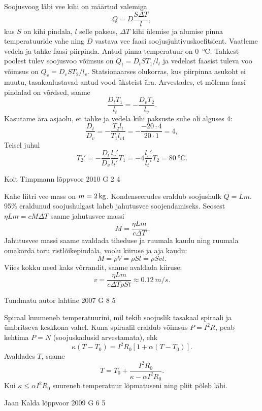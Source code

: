 \documentclass[11pt]{article}
\begin{document}
{{\ifSolution
Soojusvoog läbi vee kihi on määrtud valemiga
\[
Q = D\frac{S\Delta T}{l},
\]
kus $S$ on kihi pindala, $l$ selle paksus, $\Delta T$ kihi ülemise ja alumise pinna temperatuuride vahe ning $D$ vastava vee faasi soojusjuhtivuskoefitsient. Vaatleme vedela ja tahke faasi piirpinda. Antud pinna temperatuur on \SI{0}{\celsius}. Tahkest poolest tulev soojusvoo võimsus on
$Q_t = D_tST_1/l_t$
ja vedelast faasist tuleva voo võimsus on
$Q_v = D_vST_2/l_v$.
Statsionaarses olukorras, kus piirpinna asukoht ei muutu, tasakaalustavad antud vood üksteist ära. Arvestades, et mõlema faasi pindalad on võrdsed, saame
\[
\frac{D_tT_1}{l_t} = -\frac{D_vT_2}{l_v}.
\]
Kasutame ära asjaolu, et tahke ja vedela kihi paksuste suhe oli alguses \num{4}:
\[
\frac{D_t}{D_v} = -\frac{T_{2} l_{t}}{T_1 l_{v1}}=-\frac{\num{-20}\cdot \num{4}}{\num{20}\cdot \num{1}} = \num{4},
\]
Teisel juhul
\[
T_{2}' = -\frac{D_{t}}{D_{v}}\frac{l_{v}'}{l_{t}'} T_1 = \num{-4}\frac{l_v'}{l_t'} T_2 = \SI{80}{\celsius}.
\]
\fi
}

{Koit Timpmann} %
{lõppvoor} %
{2010} %
{G 2} %
{4} %
{

\ifSolution
Kahe liitri vee mass on $m=\SI 2{kg}$. Kondenseerudes eraldub soojushulk $Q=Lm$.
95\% eraldunud soojushulgast laheb jahutusvee soojendamiseks. Seosest $\eta Lm=cM\Delta T$ saame jahutusvee massi
\[M=\frac {\eta L m}{c\Delta T}.\]
Jahutusvee massi saame avaldada tiheduse ja ruumala kaudu ning ruumala omakorda toru ristlõikepindala, voolu kiiruse ja aja kaudu:
\[M=\rho V=\rho Sl=\rho Svt.\]
Viies kokku need kaks võrrandit, saame avaldada kiiruse:
\[v=\frac {\eta Lm}{c\Delta T \rho S t}\approx \SI{0,12}{m/s}.\]
\fi
}

{Tundmatu autor} %
{lahtine} %
{2007} %
{G 8} %
{5} %
{

\ifSolution
Spiraal kuumeneb temperatuurini, mil tekib soojuslik tasakaal spiraali ja ümbritseva keskkona vahel. Kuna spiraalil eraldub võimsus $P = I^2R$, peab kehtima $P = N$ (soojuskadusid arvestamata), ehk
\[
\kappa\left(T-T_{0}\right)=I^{2} R_{0}\left[1+\alpha\left(T-T_{0}\right)\right].
\]
Avaldades $T$, saame
\[
T=T_{0}+\frac{I^{2} R_{0}}{\kappa-\alpha I^{2} R_{0}}.
\]
Kui $\kappa \leq \alpha I^2R_0$ suureneb temperatuur lõpmatuseni ning pliit põleb läbi.
\fi
}

{Jaan Kalda} %
{lõppvoor} %
{2009} %
{G 6} %
{5} %
{

}}
\end{document}
